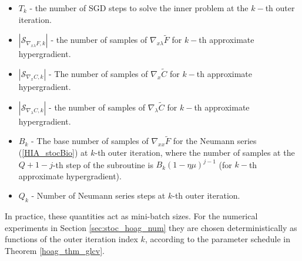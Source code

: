 \documentclass[11pt, twoside]{report}
\begin{document}
\begin{itemize}
        \item $T_k$ - the number of SGD steps to solve the inner problem at the $k-$th outer iteration.
        \item $|\mathcal{S}_{\nabla_{x\lambda} F,k}|$ - the number of samples of $\nabla_{x\lambda} \tilde{F}$ for $k-$th approximate hypergradient.
        \item $|\mathcal{S}_{\nabla_x C,k}|$ - The number of samples of $\nabla_x \tilde{C}$ for $k-$th approximate hypergradient.
        \item $|\mathcal{S}_{\nabla_\lambda C,k}|$ - the number of samples of $\nabla_\lambda \tilde{C}$ for $k-$th approximate hypergradient.
        \item $B_k$ - The base number of samples of $\nabla_{xx} \tilde{F}$ for the Neumann series (\ref{HIA_stocBio}) at $k$-th outer iteration, where the number of samples at the $Q+1-j$-th step of the subroutine is $B_k(1-\eta\mu)^{j-1}$ (for $k-$th approximate hypergradient).
        \item $Q_k$ - Number of Neumann series steps at $k$-th outer iteration.
    \end{itemize}

In practice, these quantities act as mini-batch sizes. For the numerical experiments in Section \ref{sec:stoc_hoag_num} they are chosen deterministically as functions of the outer iteration index $k$, according to the parameter schedule in Theorem \ref{hoag_thm_glcv}.

\begin{algorithm}[]
\caption{Stochastic HOAG}
\label{alg:stoc_hoag}
\DontPrintSemicolon
{}
\end{algorithm}
\end{document}
